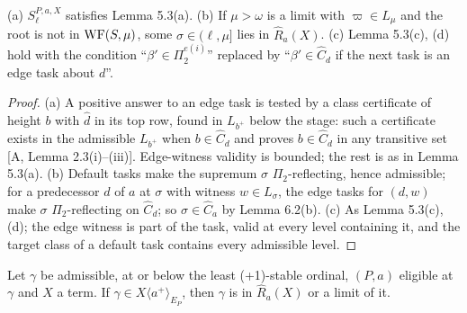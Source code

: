 \documentclass[11pt]{article}
\begin{document}
\begin{statement} (a) $S^{P,a,X}_\ell$ satisfies Lemma 5.3(a). (b) If $\mu > \omega$ is a limit with
$\varpi \in L_\mu$ and the root is not in $\mathrm{WF}(S,\mu)$, some $\sigma \in (\ell,\mu]$ lies in $\widehat R_a(X)$. (c) Lemma 5.3(c), (d) hold with the condition ``$\beta' \in
\Pi_2^{e(i)}$'' replaced by ``$\beta' \in \widehat C_d$ if the next task is an edge task about $d$''.
\end{statement}

\begin{proof}
(a) A positive answer to an edge task is tested by a class certificate of height $b$ with $\hat d$ in its top row,
found in $L_{b^+}$ below the stage: such a certificate exists in the admissible $L_{b^+}$ when $b \in
\widehat C_d$ and proves $b \in \widehat C_d$ in any transitive set [A, Lemma 2.3(i)--(iii)]. Edge-witness validity is
bounded; the rest is as in Lemma 5.3(a). (b) Default tasks make the supremum $\sigma$ $\Pi_2$-reflecting, hence
admissible; for a predecessor $d$ of $a$ at $\sigma$ with witness $w \in L_\sigma$, the edge tasks for $(d,w)$ make
$\sigma$ $\Pi_2$-reflecting on $\widehat C_d$; so $\sigma \in \widehat C_a$ by Lemma 6.2(b). (c) As Lemma 5.3(c), (d);
the edge witness is part of the task, valid at every level containing it, and the target class of a default task
contains every admissible level.
\end{proof}

\begin{statement} Let $\gamma$ be admissible, at or below the least (+1)-stable
ordinal, $(P,a)$ eligible at $\gamma$ and
$X$ a term. If $\gamma \in X\langle a^+\rangle_{E_P}$, then $\gamma$ is in $\widehat R_a(X)$ or a limit of it.
\end{statement}
\end{document}
